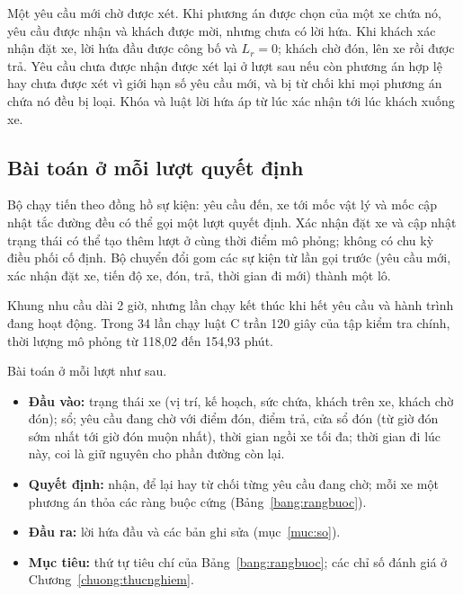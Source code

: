 Một yêu cầu mới chờ được xét. Khi phương án được chọn của một xe chứa nó, yêu cầu được nhận và khách được mời,
nhưng chưa có lời hứa. Khi khách xác nhận đặt xe, lời hứa đầu được công bố và $L_r = 0$; khách chờ đón, lên xe
rồi được trả. Yêu cầu chưa được nhận được xét lại ở lượt sau nếu còn phương án hợp lệ hay chưa được xét vì giới
hạn số yêu cầu mới, và bị từ chối khi mọi phương án chứa nó đều bị loại. Khóa và luật lời hứa áp từ lúc xác nhận
tới lúc khách xuống xe.

\subsection{Bài toán ở mỗi lượt quyết định}
\label{muc:baitoan-phatbieu}

Bộ chạy tiến theo đồng hồ sự kiện: yêu cầu đến, xe tới mốc vật lý và mốc cập nhật tắc đường đều có thể gọi một
lượt quyết định. Xác nhận đặt xe và cập nhật trạng thái có thể tạo thêm lượt ở cùng thời điểm mô phỏng; không có
chu kỳ điều phối cố định. Bộ chuyển đổi gom các sự kiện từ lần gọi trước (yêu cầu mới, xác nhận đặt xe, tiến độ xe,
đón, trả, thời gian đi mới) thành một lô.

Khung nhu cầu dài 2 giờ, nhưng lần chạy kết thúc khi hết yêu cầu và hành trình đang hoạt động. Trong 34 lần chạy
luật C trần 120 giây của tập kiểm tra chính, thời lượng mô phỏng từ 118,02 đến 154,93 phút.

Bài toán ở mỗi lượt như sau.
\begin{itemize}[leftmargin=1.2cm,itemsep=2pt,topsep=3pt]
\item \textbf{Đầu vào:} trạng thái xe (vị trí, kế hoạch, sức chứa, khách trên xe, khách chờ đón); sổ; yêu cầu
đang chờ với điểm đón, điểm trả, cửa sổ đón (từ giờ đón sớm nhất tới giờ đón muộn nhất), thời gian ngồi xe tối
đa; thời gian đi lúc này, coi là giữ nguyên cho phần đường còn lại.
\item \textbf{Quyết định:} nhận, để lại hay từ chối từng yêu cầu đang chờ; mỗi xe một phương án thỏa các ràng
buộc cứng (Bảng~\ref{bang:rangbuoc}).
\item \textbf{Đầu ra:} lời hứa đầu và các bản ghi sửa (mục~\ref{muc:so}).
\item \textbf{Mục tiêu:} thứ tự tiêu chí của Bảng~\ref{bang:rangbuoc}; các chỉ số đánh giá ở
Chương~\ref{chuong:thucnghiem}.
\end{itemize}

